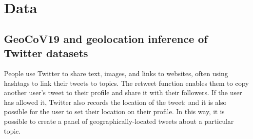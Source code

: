 \documentclass{article}
\begin{document}
\section{Data}
\subsection{GeoCoV19 and geolocation inference of Twitter datasets}\label{geocov}
People use Twitter to share text, images, and links to websites, often using hashtags to link their tweets to topics. The retweet function enables them to copy another user's tweet to their profile and share it with their followers. If the user has allowed it, Twitter also records the location of the tweet; and it is also possible for the user to set their location on their profile. In this way, it is possible to create a panel of geographically-located tweets about a particular topic. 
\end{document}
